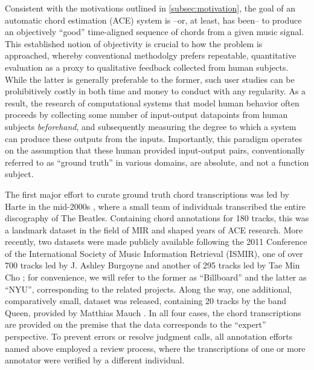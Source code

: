 Consistent with the motivations outlined in \ref{subsec:motivation}, the goal of an automatic chord estimation (ACE) system is --or, at least, has been-- to produce an objectively ``good'' time-aligned sequence of chords from a given music signal.
This established notion of objectivity is crucial to how the problem is approached, whereby conventional methodolgy prefers repeatable, quantitative evaluation as a proxy to qualitative feedback collected from human subjects.
While the latter is generally preferable to the former, such user studies can be prohibitively costly in both time and money to conduct with any regularity.
As a result, the research of computational systems that model human behavior often proceeds by collecting some number of input-output datapoints from human subjects \emph{beforehand}, and subsequently measuring the degree to which a system can produce these outputs from the inputs.
Importantly, this paradigm operates on the assumption that these human provided input-output pairs, conventionally referred to as ``ground truth'' in various domains, are absolute, and not a function subject.

The first major effort to curate ground truth chord transcriptions was led by Harte in the mid-2000s \cite{Isophonics}, where a small team of individuals transcribed the entire discography of The Beatles.
Containing chord annotations for 180 tracks, this was a landmark dataset in the field of MIR and shaped years of ACE research.
More recently, two datasets were made publicly available following the 2011 Conference of the International Society of Music Information Retrieval (ISMIR), one of over 700 tracks led by J. Ashley Burgoyne \cite{Burgoyne2011} and another of 295 tracks led by Tae Min Cho \cite{Cho2011b}; for convenience, we will refer to the former as ``Billboard'' and the latter as ``NYU'', corresponding to the related projects.
Along the way, one additional, comparatively small, dataset was released, containing 20 tracks by the band Queen, provided by Matthias Mauch \cite{Mauch2009x}.
In all four cases, the chord transcriptions are provided on the premise that the data corresponds to the ``expert'' perspective.
To prevent errors or resolve judgment calls, all annotation efforts named above employed a review process, where the transcriptions of one or more annotator were verified by a different individual.


